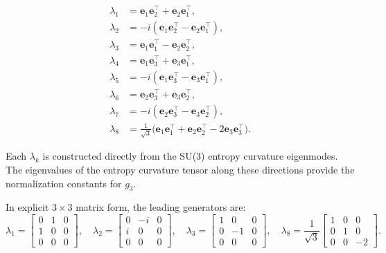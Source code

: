 \documentclass[11pt]{article}
\begin{document}
\begin{align}
  \lambda_1 &= \mathbf{e}_1\mathbf{e}_2^\top
               + \mathbf{e}_2\mathbf{e}_1^\top, \\
  \lambda_2 &= -i(\mathbf{e}_1\mathbf{e}_2^\top
               - \mathbf{e}_2\mathbf{e}_1^\top), \\
  \lambda_3 &= \mathbf{e}_1\mathbf{e}_1^\top
               - \mathbf{e}_2\mathbf{e}_2^\top, \\
  \lambda_4 &= \mathbf{e}_1\mathbf{e}_3^\top
               + \mathbf{e}_3\mathbf{e}_1^\top, \\
  \lambda_5 &= -i(\mathbf{e}_1\mathbf{e}_3^\top
               - \mathbf{e}_3\mathbf{e}_1^\top), \\
  \lambda_6 &= \mathbf{e}_2\mathbf{e}_3^\top
               + \mathbf{e}_3\mathbf{e}_2^\top, \\
  \lambda_7 &= -i(\mathbf{e}_2\mathbf{e}_3^\top
               - \mathbf{e}_3\mathbf{e}_2^\top), \\
  \lambda_8 &= \frac{1}{\sqrt{3}}
               \bigl(\mathbf{e}_1\mathbf{e}_1^\top
               + \mathbf{e}_2\mathbf{e}_2^\top
               - 2\mathbf{e}_3\mathbf{e}_3^\top\bigr).
\end{align}

Each $\lambda_k$ is constructed directly from the SU(3) entropy
curvature eigenmodes. The eigenvalues of the entropy curvature
tensor along these directions provide the normalization constants
for $g_3$.

In explicit $3\times3$ matrix form, the leading generators are:
\begin{equation}
  \lambda_1 =
  \begin{bmatrix}0&1&0\\1&0&0\\0&0&0\end{bmatrix},\quad
  \lambda_2 =
  \begin{bmatrix}0&-i&0\\i&0&0\\0&0&0\end{bmatrix},\quad
  \lambda_3 =
  \begin{bmatrix}1&0&0\\0&-1&0\\0&0&0\end{bmatrix},\quad
  \lambda_8 =
  \frac{1}{\sqrt{3}}
  \begin{bmatrix}1&0&0\\0&1&0\\0&0&-2\end{bmatrix}.
\end{equation}
\end{document}
